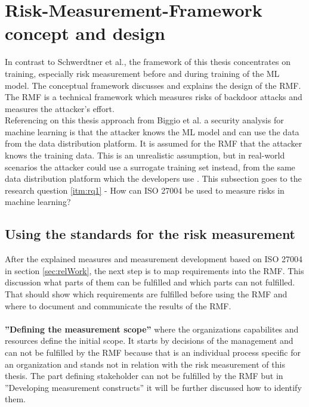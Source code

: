 
\section{Risk-Measurement-Framework concept and design}
\label{sec:conFrame}

In contrast to Schwerdtner et al., the framework of this thesis concentrates on training, especially risk measurement before and during training of the ML model. The conceptual framework discusses and explains the design of the RMF. The RMF is a technical framework which measures risks of backdoor attacks and measures the attacker's effort. \\ Referencing on this thesis approach from Biggio et al. \cite{DBLP:conf/icml/BiggioNL12} a security analysis for machine learning is that the attacker knows the ML model and can use the data from the data distribution platform. It is assumed for the RMF that the attacker knows the training data. This is an unrealistic assumption, but in real-world scenarios the attacker could use a surrogate training set instead, from the same data distribution platform which the developers use \cite{DBLP:journals/ml/BarrenoNJT10}. This subsection goes to the research question \ref{itm:rq1} - How can ISO 27004 be used to measure risks in machine learning?

\subsection{Using the standards for the risk measurement}
\label{sec:standard}

After the explained measures and measurement development based on ISO 27004 in section \ref{sec:relWork}, the next step is to map requirements into the RMF. This discussion what parts of them can be fulfilled and which parts can not fulfilled. That should show which requirements are fulfilled before using the RMF and where to document and communicate the results of the RMF. \\ \\

\textbf{''Defining the measurement scope''} where the organizations capabilites and resources define the initial scope. It starts by decisions of the management and can not be fulfilled by the RMF because that is an individual process specific for an organization and stands not in relation with the risk measurement of this thesis. The part defining stakeholder can not be fulfilled by the RMF but in ''Developing measurement constructs'' it will be further discussed how to identify them.  \\ \\

